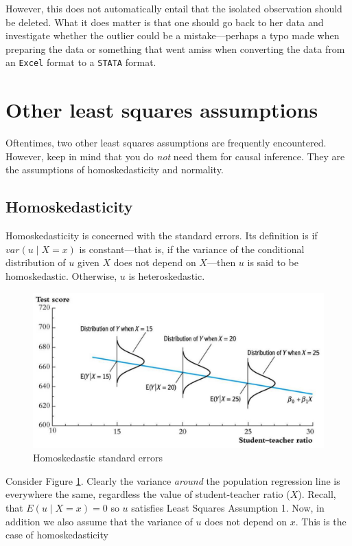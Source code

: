 \documentclass[
]{book}
\begin{document}
However, this does not automatically entail that the isolated observation should be deleted. What it does matter is that one should go back to her data and investigate whether the outlier could be a mistake---perhaps a typo made when preparing the data or something that went amiss when converting the data from an \texttt{Excel} format to a \texttt{STATA} format.

\hypertarget{other-least-squares-assumptions}{%
\section{Other least squares assumptions}\label{other-least-squares-assumptions}}

Oftentimes, two other least squares assumptions are frequently encountered. However, keep in mind that you do \emph{not} need them for causal inference. They are the assumptions of homoskedasticity and normality.

\hypertarget{homoskedasticity}{%
\subsection{Homoskedasticity}\label{homoskedasticity}}

Homoskedasticity is concerned with the standard errors. Its definition is if \(var(u \mid X=x)\) is constant---that is, if the variance of the conditional distribution of \(u\) given \(X\) does not depend on \(X\)---then \(u\) is said to be homoskedastic. Otherwise, \(u\) is heteroskedastic.

\begin{figure}
\includegraphics[width=19.71in]{./figures/Sheet21} \caption{Homoskedastic standard errors}\label{fig:homoskedasticity}
\end{figure}

Consider Figure \ref{fig:homoskedasticity}. Clearly the variance \emph{around} the population regression line is everywhere the same, regardless the value of student-teacher ratio (\(X\)). Recall, that \(E(u \mid X=x) = 0\) so \(u\) satisfies Least Squares Assumption 1. Now, in addition we also assume that the variance of \(u\) does not depend on \(x\). This is the case of homoskedasticity
\end{document}
